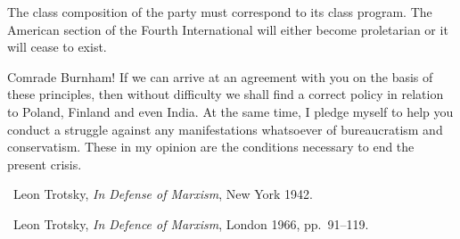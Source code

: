 The class composition of the party must correspond to its class program. The American section of the Fourth International will either become proletarian or it will cease to exist.

\triast

Comrade Burnham! If we can arrive at an agreement with you on the basis of these principles, then without difficulty we shall find a correct policy in relation to Poland, Finland and even India. At the same time, I pledge myself to help you conduct a struggle against any manifestations whatsoever of bureaucratism and conservatism. These in my opinion are the conditions necessary to end the present crisis.


\begin{letterinfo}
	\firstpublished\ Leon Trotsky, \emph{In Defense of Marxism}, New York 1942.
	
	\checkedagainst\ Leon Trotsky, \emph{In Defence of Marxism}, London 1966, pp.~91--119.
\end{letterinfo}